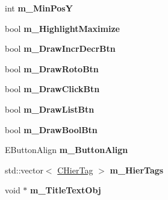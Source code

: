\begin{DoxyCompactItemize}
\item 
\hypertarget{struct_c_tw_bar_a4ecbaf6c5501b02c974507dd255ed92c}{int {\bfseries m\+\_\+\+Min\+Pos\+Y}}\label{struct_c_tw_bar_a4ecbaf6c5501b02c974507dd255ed92c}

\item 
\hypertarget{struct_c_tw_bar_aeb11a24aeecfca942efcfd8f53b7ec69}{bool {\bfseries m\+\_\+\+Highlight\+Maximize}}\label{struct_c_tw_bar_aeb11a24aeecfca942efcfd8f53b7ec69}

\item 
\hypertarget{struct_c_tw_bar_afff526fca5a77d7930da4500613e6c13}{bool {\bfseries m\+\_\+\+Draw\+Incr\+Decr\+Btn}}\label{struct_c_tw_bar_afff526fca5a77d7930da4500613e6c13}

\item 
\hypertarget{struct_c_tw_bar_af888761ac8010fe7f9a82f8499da71bd}{bool {\bfseries m\+\_\+\+Draw\+Roto\+Btn}}\label{struct_c_tw_bar_af888761ac8010fe7f9a82f8499da71bd}

\item 
\hypertarget{struct_c_tw_bar_aedc24e3d1722e7a8306a61ba851333e6}{bool {\bfseries m\+\_\+\+Draw\+Click\+Btn}}\label{struct_c_tw_bar_aedc24e3d1722e7a8306a61ba851333e6}

\item 
\hypertarget{struct_c_tw_bar_a8be2fea5e580e40bf042c75b5293978a}{bool {\bfseries m\+\_\+\+Draw\+List\+Btn}}\label{struct_c_tw_bar_a8be2fea5e580e40bf042c75b5293978a}

\item 
\hypertarget{struct_c_tw_bar_a82fc21266405ff6cd3f67a279c8d1280}{bool {\bfseries m\+\_\+\+Draw\+Bool\+Btn}}\label{struct_c_tw_bar_a82fc21266405ff6cd3f67a279c8d1280}

\item 
\hypertarget{struct_c_tw_bar_a3b911f352ffbf81ad8a923caca728895}{E\+Button\+Align {\bfseries m\+\_\+\+Button\+Align}}\label{struct_c_tw_bar_a3b911f352ffbf81ad8a923caca728895}

\item 
\hypertarget{struct_c_tw_bar_af940a922249c69b8433412d4486c815f}{std\+::vector$<$ \hyperlink{struct_c_tw_bar_1_1_c_hier_tag}{C\+Hier\+Tag} $>$ {\bfseries m\+\_\+\+Hier\+Tags}}\label{struct_c_tw_bar_af940a922249c69b8433412d4486c815f}

\item 
\hypertarget{struct_c_tw_bar_a2277b1c24c2610b53692bc22a553d791}{void $\ast$ {\bfseries m\+\_\+\+Title\+Text\+Obj}}\label{struct_c_tw_bar_a2277b1c24c2610b53692bc22a553d791}


\end{DoxyCompactItemize}
